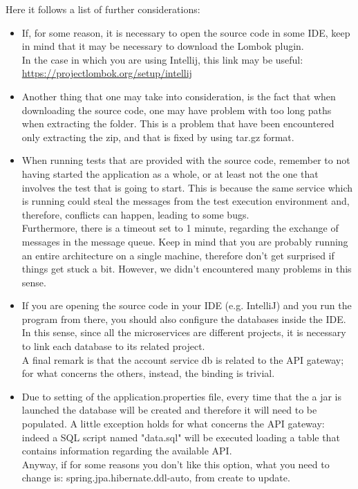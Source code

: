 \par 
Here it follows a list of further considerations: 
\begin{itemize}
\item If, for some reason, it is necessary to open the source code in some IDE, keep in mind that it
may be necessary to download the Lombok plugin. \\
In the case in which you are using Intellij, this link may be useful:\\
\url{https://projectlombok.org/setup/intellij}

\item Another thing that one may take into consideration, is the fact that when downloading the source code, one may have problem with too long
paths when extracting the folder. This is a problem that have been encountered only extracting the zip, and that is fixed
by using tar.gz format. 

\item When running tests that are provided with the source code, remember to not having started the application as a whole, or at least not
the one that involves the test that is going to start. This is because the same service which is running could steal the messages from the test execution environment and, therefore, conflicts can happen, leading to some bugs. \\
Furthermore, there is a timeout set to 1 minute, regarding the exchange of messages in the message queue. Keep in mind that you are probably
running an entire architecture on a single machine, therefore don't get surprised if things get stuck a bit. However, we didn't encountered
many problems in this sense.

\item If you are opening the source code in your IDE (e.g. IntelliJ) and you run the program from there, you should also configure
the databases inside the IDE. In this sense, since all the microservices are different projects, it is necessary to link each database
to its related project. \\ A final remark is that the account service db is related to the API gateway; for what concerns the others, instead,
the binding is trivial.   

\item Due to setting of the application.properties file, every time that the a jar is launched the database will be created and therefore
it will need to be populated. A little exception holds for what concerns the API gateway: indeed a SQL script named "data.sql" will be
executed loading a table that contains information regarding the available API. \\ 
Anyway, if for some reasons you don't like this option, what you need to change is: spring.jpa.hibernate.ddl-auto, from create to update.

\end{itemize}

